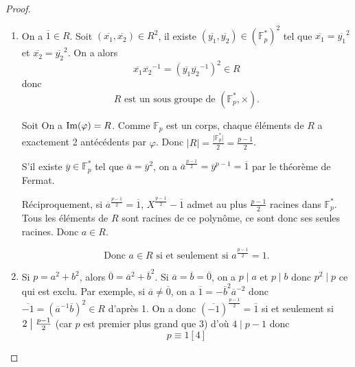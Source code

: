 \documentclass[12pt]{article}
\begin{document}
\begin{proof}
	\phantom{}
	\begin{enumerate}
		\item On a $\overline{1}\in R$. Soit $(\overline{x_{1}},\overline{x_{2}})\in R^{2}$, il existe $(\overline{y_{1}},\overline{y_{2}})\in(\mathbb{F}_{p}^{*})^{2}$ tel que $\overline{x_{1}}=\overline{y_{1}}^{2}$ et $\overline{x_{2}}=\overline{y_{2}}^{2}$. On a  alors 
		\begin{equation}
			\overline{x_{1}}\overline{x_{2}}^{-1}=(\overline{y_{1}}\overline{y_{2}}^{-1})^{2}\in R
		\end{equation}
		donc 
		\begin{equation}
			\boxed{R\text{ est un sous groupe de }(\mathbb{F}_{p}^{*},\times).}
		\end{equation}
		
		Soit 
		On a $\mathrm{Im}(\varphi)=R$. Comme $\mathbb{F}_{p}$ est un corps, chaque éléments de $R$ a exactement 2 antécédents par $\varphi$. Donc $\vert R\vert=\frac{\vert\mathbb{F}_{p}^{*}\vert}{2}=\frac{p-1}{2}$.

		S'il existe $\overline{y}\in\mathbb{F}_{p}^{*}$ tel que $\overline{a}=\overline{y}^{2}$, on a $\overline{a}^{\frac{p-1}{2}}=\overline{y}^{p-1}=\overline{1}$ par le théorème de Fermat.

		Réciproquement, si $\overline{a}^{\frac{p-1}{2}}=\overline{1}$, $X^{\frac{p-1}{2}}-\overline{1}$ admet au plus $\frac{p-1}{2}$ racines dans $\mathbb{F}_{p}^{*}$. Tous les éléments de $R$ sont racines de ce polynôme, ce sont donc ses seules racines. Donc $a\in R$.

		\begin{equation}
			\boxed{\text{Donc }a\in R\text{ si et seulement si }a^{\frac{p-1}{2}}=1.}
		\end{equation}

		\item Si $p=a^{2}+b^{2}$, alors $\overline{0}=\overline{a}^{2}+\overline{b}^{2}$. Si $\overline{a}=\overline{b}=\overline{0}$, on a $p\mid a$ et $p\mid b$ donc $p^{2}\mid p$ ce qui est exclu. Par exemple, si $\overline{a}\neq\overline{0}$, on a $\overline{1}=-\overline{b}^{2}\overline{a}^{-2}$ donc $\overline{-1}=(\overline{a}^{-1}\overline{b})^{2}\in R$ d'après 1. On a donc $(\overline{-1})^{\frac{p-1}{2}}=\overline{1}$ si et seulement si $2\bigm|\frac{p-1}{2}$ (car $p$ est premier plus grand que 3) d'où $4\mid p-1$ donc 
		\begin{equation}
			\boxed{p\equiv 1[4]}
		\end{equation}
		

\end{enumerate}
\end{proof}
\end{document}
